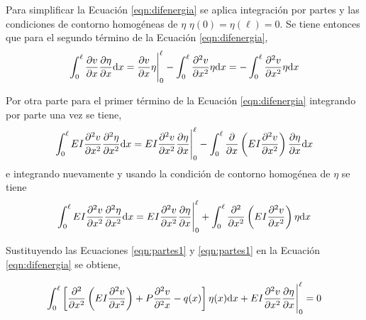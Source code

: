 Para simplificar la Ecuación \eqref{eqn:difenergia} se aplica integración por partes y las condiciones de contorno homogéneas de $\eta$ $\eta(0)=\eta(\ell)=0$. %
%
Se tiene entonces que para el segundo término de la Ecuación \eqref{eqn:difenergia},
%
\begin{equation}\label{eqn:partes1}
\int_0^\ell \frac{\partial v}{\partial x} \frac{\partial \eta}{\partial x}{\text{d}} x = \frac{\partial v}{\partial x}\eta\Bigg|_0^\ell - \int_0^\ell \frac{\partial^2 v}{\partial x^2} \eta{\text{d}} x 
= -\int_0^\ell \frac{\partial^2 v}{\partial x^2} \eta{\text{d}} x
\end{equation}

Por otra parte para el primer término de la Ecuación \eqref{eqn:difenergia} integrando por parte una vez se tiene,
%
$$
\int_0^\ell EI\frac{\partial^2 v}{\partial x^2} \frac{\partial^2 \eta}{\partial x^2}\dif x %
%
= EI\frac{\partial^2 v}{\partial x^2} \frac{\partial \eta}{\partial x}\Bigg|_0^\ell - \int_0^\ell \frac{\partial}{\partial x} \left( EI\frac{\partial^2 v}{\partial x^2} \right) \frac{\partial \eta}{\partial x}\dif x %
$$
e integrando nuevamente y usando la condición de contorno homogénea de $\eta$ se tiene
%
\begin{equation}\label{eqn:partes2}
\int_0^\ell EI\frac{\partial^2 v}{\partial x^2} \frac{\partial^2 \eta}{\partial x^2}\dif x %
%
= EI\frac{\partial^2 v}{\partial x^2} \frac{\partial \eta}{\partial x}\Bigg|_0^\ell %
%
+ \int_0^\ell \frac{\partial^2}{\partial x^2} \left( EI \frac{\partial^2 v}{\partial x^2} \right) \eta\dif x
\end{equation}

Sustituyendo las Ecuaciones \eqref{eqn:partes1} y \eqref{eqn:partes1} en la Ecuación \eqref{eqn:difenergia} se obtiene,

\begin{equation}\label{eqn:difenergia2}
\int_0^\ell \left[ \frac{\partial^2}{\partial x^2} \left(  EI \frac{\partial^2 v}{\partial x^2} \right) + P \frac{\partial^2 v}{\partial^2 x} - q(x)  \right] \eta(x) {\text{d}} x + EI\frac{\partial^2 v}{\partial x^2} \frac{\partial \eta}{\partial x}\Bigg|_0^\ell = 0
\end{equation}


